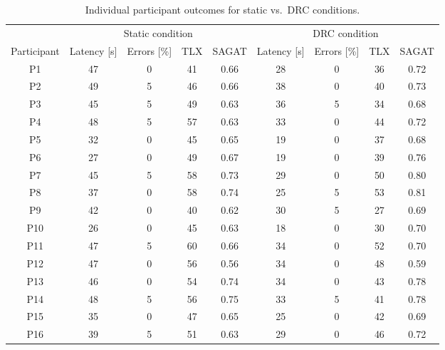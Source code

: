 \documentclass[journal]{new-aiaa}
\newcommand{\DRC}{\textsc{DRC}}
\begin{document}
\begin{table}[h!]
\centering
\caption{Individual participant outcomes for static vs.\ \DRC{} conditions.}
\label{tab:hmi_subjects}
\begin{tabular}{@{}c cccc cccc@{}}
\toprule
 & \multicolumn{4}{c}{Static condition} & \multicolumn{4}{c}{DRC condition} \\
Participant & Latency [s] & Errors [\%] & TLX & SAGAT & Latency [s] & Errors [\%] & TLX & SAGAT \\
\midrule
P1 & 47 & 0 & 41 & 0.66 & 28 & 0 & 36 & 0.72 \\
P2 & 49 & 5 & 46 & 0.66 & 38 & 0 & 40 & 0.73 \\
P3 & 45 & 5 & 49 & 0.63 & 36 & 5 & 34 & 0.68 \\
P4 & 48 & 5 & 57 & 0.63 & 33 & 0 & 44 & 0.72 \\
P5 & 32 & 0 & 45 & 0.65 & 19 & 0 & 37 & 0.68 \\
P6 & 27 & 0 & 49 & 0.67 & 19 & 0 & 39 & 0.76 \\
P7 & 45 & 5 & 58 & 0.73 & 29 & 0 & 50 & 0.80 \\
P8 & 37 & 0 & 58 & 0.74 & 25 & 5 & 53 & 0.81 \\
P9 & 42 & 0 & 40 & 0.62 & 30 & 5 & 27 & 0.69 \\
P10 & 26 & 0 & 45 & 0.63 & 18 & 0 & 30 & 0.70 \\
P11 & 47 & 5 & 60 & 0.66 & 34 & 0 & 52 & 0.70 \\
P12 & 47 & 0 & 56 & 0.56 & 34 & 0 & 48 & 0.59 \\
P13 & 46 & 0 & 54 & 0.74 & 34 & 0 & 43 & 0.78 \\
P14 & 48 & 5 & 56 & 0.75 & 33 & 5 & 41 & 0.78 \\
P15 & 35 & 0 & 47 & 0.65 & 25 & 0 & 42 & 0.69 \\
P16 & 39 & 5 & 51 & 0.63 & 29 & 0 & 46 & 0.72 \\
\bottomrule
\end{tabular}
\end{table}
\end{document}
